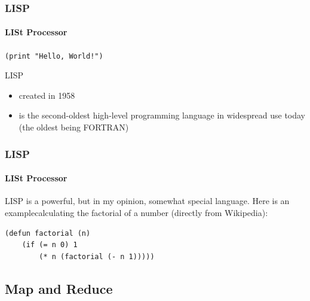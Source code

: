 \documentclass[aspectratio=169,usenames,dvipsnames]{beamer}
\begin{document}
    \begin{frame}
        \frametitle{LISP}
        \framesubtitle{LISt Processor}
            \begin{center}\texttt{(print "Hello, World!")}\end{center}
        \begin{block}{LISP}
            \begin{itemize}
                \item created in 1958
                \item is the second-oldest high-level programming language in widespread use today (the oldest being FORTRAN)
            \end{itemize}
        \end{block}

    \end{frame}
    \begin{frame}[fragile]
        \frametitle{LISP}
        \framesubtitle{LISt Processor}
\begin{minipage}{0.42\textwidth}
\raggedright
LISP is a powerful, but in my opinion, somewhat special language. Here is an example\footnotemark calculating the factorial of a number {\small (directly from Wikipedia)}:
\begin{lstlisting}
(defun factorial (n)
    (if (= n 0) 1
        (* n (factorial (- n 1)))))
\end{lstlisting}
\end{minipage}
\hfill
{}
    \end{frame}

    \subsection{Map and Reduce}
\end{document}
